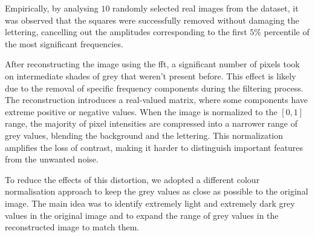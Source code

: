     \noindent Empirically, by analysing $10$ randomly selected real images from the dataset, it was observed that the squares were successfully removed without damaging the lettering, cancelling out the amplitudes corresponding to the first $5\%$ percentile of the most significant frequencies.

	\begin{modified}
    \noindent After reconstructing the image using the \gls{fft}, a significant number of pixels took on intermediate shades of grey that weren't present before. This effect is likely due to the removal of specific frequency components during the filtering process. The reconstruction introduces a real-valued matrix, where some components have extreme positive or negative values. When the image is normalized to the $[0,1]$ range, the majority of pixel intensities are compressed into a narrower range of grey values, blending the background and the lettering. This normalization amplifies the loss of contrast, making it harder to distinguish important features from the unwanted noise.
	\end{modified}

	\noindent To reduce the effects of this distortion, we adopted a different colour normalisation approach to keep the grey values as close as possible to the original image. The main idea was to identify extremely light and extremely dark grey values in the original image and to expand the range of grey values in the reconstructed image to match them.

